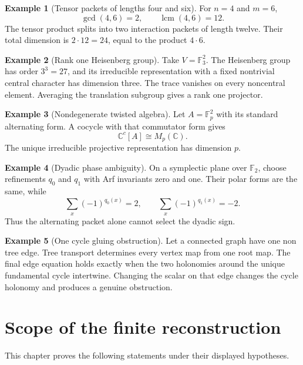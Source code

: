 \documentclass[11pt]{amsart}
\theoremstyle{definition}
\newtheorem{example}[example]{Example}
\theoremstyle{remark}
\newcommand{\CC}{\mathbb C}
\newcommand{\FF}{\mathbb F}
\newcommand{\lcm}{\operatorname{lcm}}
\begin{document}
\begin{example}[Tensor packets of lengths four and six]\label{ex:tensor_46}
For \(n=4\) and \(m=6\),
\[
\gcd(4,6)=2,
\qquad
\lcm(4,6)=12.
\]
The tensor product splits into two interaction packets of length twelve. Their total dimension is \(2\cdot12=24\), equal to the product \(4\cdot6\).
\end{example}

\begin{example}[Rank one Heisenberg group]\label{ex:heisenberg_rank_one}
Take \(V=\FF_3^2\). The Heisenberg group has order \(3^3=27\), and its irreducible representation with a fixed nontrivial central character has dimension three. The trace vanishes on every noncentral element. Averaging the translation subgroup gives a rank one projector.
\end{example}

\begin{example}[Nondegenerate twisted algebra]\label{ex:twisted_plane}
Let \(A=\FF_p^2\) with its standard alternating form. A cocycle with that commutator form gives
\[
\CC^c[A]\cong M_p(\CC).
\]
The unique irreducible projective representation has dimension \(p\).
\end{example}

\begin{example}[Dyadic phase ambiguity]\label{ex:dyadic_plane}
On a symplectic plane over \(\FF_2\), choose refinements \(q_0\) and \(q_1\) with Arf invariants zero and one. Their polar forms are the same, while
\[
\sum_x(-1)^{q_0(x)}=2,
\qquad
\sum_x(-1)^{q_1(x)}=-2.
\]
Thus the alternating packet alone cannot select the dyadic sign.
\end{example}

\begin{example}[One cycle gluing obstruction]\label{ex:one_cycle}
Let a connected graph have one non tree edge. Tree transport determines every vertex map from one root map. The final edge equation holds exactly when the two holonomies around the unique fundamental cycle intertwine. Changing the scalar on that edge changes the cycle holonomy and produces a genuine obstruction.
\end{example}

\section{Scope of the finite reconstruction}\label{sec:scope}

This chapter proves the following statements under their displayed hypotheses.
\end{document}
